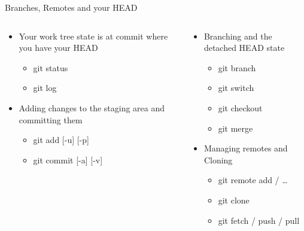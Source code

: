\documentclass[xetex]{beamer}
\begin{document}
\begin{frame}{Branches, Remotes and your HEAD}
  \begin{columns}[t]
    \begin{column}{.5\linewidth}
      \begin{itemize}
        \item Your work tree state is at commit where you have your HEAD
          \begin{itemize} \ttfamily 
            \item git status
            \item git log
          \end{itemize}
        \item Adding changes to the staging area and committing them
          \begin{itemize} \ttfamily
            \item git add [-u] [-p]
            \item git commit [-a] [-v]
          \end{itemize}
      \end{itemize}
    \end{column}
    \begin{column}{.5\linewidth}
      \begin{itemize}
        \item Branching and the detached HEAD state
          \begin{itemize} \ttfamily
            \item git branch
            \item git switch
            \item git checkout
            \item git merge
          \end{itemize}
        \item Managing remotes and Cloning
          \begin{itemize} \ttfamily
            \item git remote add / \ldots
            \item git clone
            \item git fetch / push / pull
          \end{itemize}
      \end{itemize}
    \end{column}
  \end{columns}
\end{frame}
\end{document}
